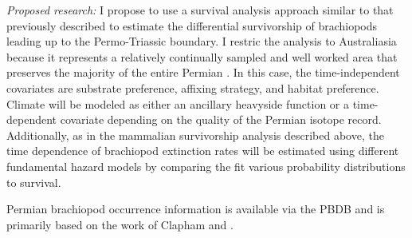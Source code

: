 \documentclass[12pt,letterpaper]{article}
\begin{document}
\textit{Proposed research:}
I propose to use a survival analysis approach similar to that previously described to estimate the differential survivorship of brachiopods leading up to the Permo-Triassic boundary. I restric the analysis to Australiasia because it represents a relatively continually sampled and well worked area that preserves the majority of the entire Permian \citep{Clapham2012,Clapham2008a,Waterhouse1987,Archbold1995}. In this case, the time-independent covariates are substrate preference, affixing strategy, and habitat preference. Climate will be modeled as either an ancillary heavyside function or a time-dependent covariate depending on the quality of the Permian isotope record. Additionally, as in the mammalian survivorship analysis described above, the time dependence of brachiopod extinction rates will be estimated using different fundamental hazard models by comparing the fit various probability distributions to survival.

Permian brachiopod occurrence information is available via the PBDB and is primarily based on the work of Clapham \citep{Clapham2006,Clapham2008a,Clapham2007a,Clapham2012,Clapham2007} and \citet{Waterhouse1987}.
\end{document}
